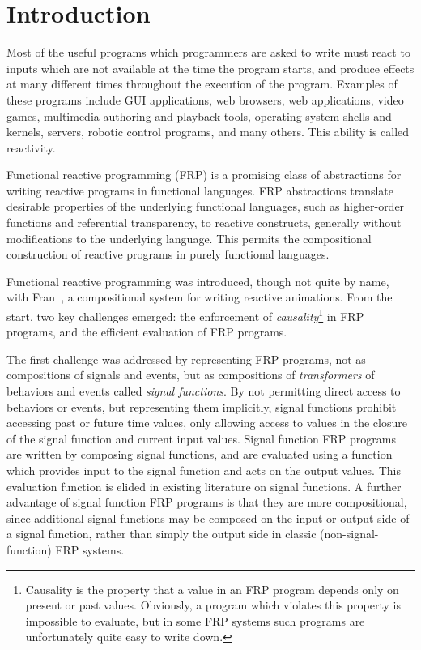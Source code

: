 \section{Introduction}
\label{section:Introduction}

Most of the useful programs which programmers are asked to write must react to inputs which are not available at the time the program starts,
and produce effects at many different times throughout the execution of the program. Examples of these programs include GUI applications,
web browsers, web applications, video games, multimedia authoring and playback tools, operating system shells and kernels, servers,
robotic control programs, and many others. This ability is called reactivity.

Functional reactive programming (FRP) is a promising class of abstractions for writing reactive programs in functional languages. FRP 
abstractions translate desirable properties of the underlying functional languages, such as higher-order functions and referential
transparency, to reactive constructs, generally without modifications to the underlying language. This permits the compositional
construction of reactive programs in purely functional languages.

Functional reactive programming was introduced, though not quite by name, with Fran~\cite{Elliott1997}, a compositional system for writing
reactive animations. From the start, two key challenges emerged: the enforcement of {\em causality}\footnote{Causality is the property 
that a value in an FRP program depends only on present or past values. Obviously, a program which violates this property is impossible to
evaluate, but in some FRP systems such programs are unfortunately quite easy to write down.} in FRP programs, and the efficient
evaluation of FRP programs.

The first challenge was addressed by representing FRP programs, not as compositions of signals and events, but as compositions of
{\em transformers} of behaviors and events called {\em signal functions}. By not permitting direct access to behaviors or events, but
representing them implicitly, signal functions prohibit accessing past or future time values, only allowing access to values in the closure of the signal function
and current input values. Signal function FRP programs are written by composing signal functions, and are evaluated using a function which provides input to the
signal function and acts on the output values. This evaluation function is elided in existing literature on signal functions. 
A further advantage of signal function FRP programs is that they are more compositional, since additional signal functions may be composed
on the input or output side of a signal function, rather than simply the output side in classic (non-signal-function) FRP systems.

